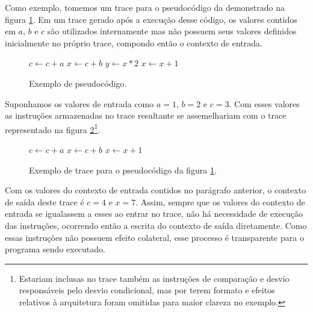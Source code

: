 Como exemplo, tomemos um trace para o pseudocódigo da demonstrado na figura \ref{Fig:ExemploContexto1}. Em um trace gerado após a execução desse código, os valores contidos em $a$, $b$ e $c$ são utilizados internamente mas não possuem seus valores definidos inicialmente no próprio trace, compondo então o contexto de entrada.

\begin{figure}[!h]
	\label{Fig:ExemploContexto1}
	\caption[Exemplo de pseudocódigo]{
		Exemplo de pseudocódigo.}
	
		\begin{algorithmic}
			\STATE $c \leftarrow c + a$
			\STATE $x \leftarrow c + b$
			\STATE $y \leftarrow x * 2$
			\ELSE
			\STATE $x \leftarrow x + 1$
			\ENDIF
		\end{algorithmic}
	\legend{Fonte: elaborada pelo autor}
\end{figure}

Suponhamos os valores de entrada como $a = 1$, $b = 2$ e $c = 3$. Com esses valores as instruções armazenadas no trace resultante se assemelhariam com o trace representado na figura \ref{Fig:ExemploContexto2}\footnote{Estariam inclusas no trace também as instruções de comparação e desvio responsáveis pelo desvio condicional, mas por terem formato e efeitos relativos à arquitetura foram omitidas para maior clareza no exemplo.}. 

\begin{figure}[!h]
	\label{Fig:ExemploContexto2}
	\caption[Exemplo de trace para o pseudocódigo da figura \ref{Fig:ExemploContexto1}]{
		Exemplo de trace para o pseudocódigo da figura \ref{Fig:ExemploContexto1}.}
	
	\begin{algorithmic}
		\STATE $c \leftarrow c + a$
		\STATE $x \leftarrow c + b$
		\STATE $x \leftarrow x + 1$
	\end{algorithmic}
\end{figure}

Com os valores do contexto de entrada contidos no parágrafo anterior, o contexto de saída deste trace é $c = 4$ e $x = 7$. Assim, sempre que os valores do contexto de entrada se igualassem a esses ao entrar no trace, não há necessidade de execução das instruções, ocorrendo então a escrita do contexto de saída diretamente. Como essas instruções não possuem efeito colateral, esse processo é transparente para o programa sendo executado.

